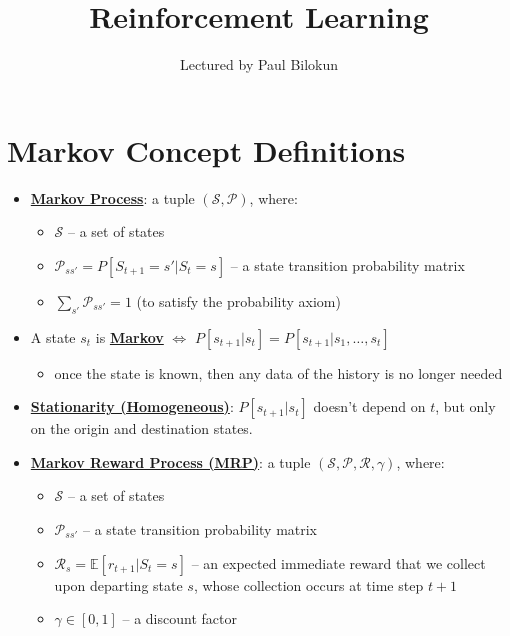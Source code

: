 \documentclass[twocolumn,landscape,10pt]{article}
\author{Lectured by Paul Bilokun}
\title{Reinforcement Learning}
\affil{Typed by Aris Zhu Yi Qing}
\theoremstyle{definition}
\begin{document}
\maketitle
\tableofcontents
\newpage

\section{Markov Concept Definitions}

\begin{itemize}
    \item \textbf{\underline{Markov Process}}: a tuple
        $(\mathcal{S},\mathcal{P})$, where:
        \begin{itemize}
            \item $\mathcal{S}$ -- a set of states
            \item $\mathcal{P}_{ss'} = P[S_{t+1}=s'|S_t=s]$ -- a state
                transition probability matrix
            \item $\sum_{s'}\mathcal{P}_{ss'}=1$ (to satisfy the probability axiom)
        \end{itemize}
    \item A state $s_t$ is \textbf{\underline{Markov}} $\iff$
        $P[s_{t+1}|s_t]=P[s_{t+1}|s_1,\ldots,s_t]$
        \begin{itemize}
            \item once the state is known, then any data of the history is
                no longer needed
        \end{itemize}
    \item \textbf{\underline{Stationarity (Homogeneous)}}: $P[s_{t+1}|s_t]$
        doesn't depend on $t$, but only on the origin and destination states.
    \item \textbf{\underline{Markov Reward Process (MRP)}}: a tuple
        $(\mathcal{S}, \mathcal{P}, \mathcal{R}, \gamma)$, where:
        \begin{itemize}
            \item $\mathcal{S}$ -- a set of states
            \item $\mathcal{P}_{ss'}$ -- a state transition probability matrix
            \item $\mathcal{R}_s = \mathbb{E}[r_{t+1}|S_t=s]$ -- an expected
                immediate reward that we collect upon departing state $s$, whose
                collection occurs at time step $t+1$
            \item $\gamma\in[0,1]$ -- a discount factor
        \end{itemize}

\end{itemize}
\end{document}
